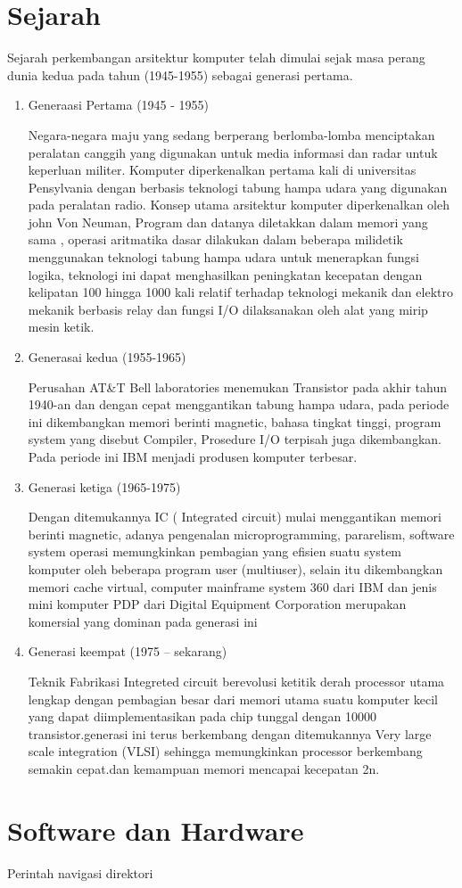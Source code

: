 \section{Sejarah}
Sejarah perkembangan arsitektur komputer telah dimulai sejak masa perang dunia kedua pada tahun (1945-1955) sebagai generasi pertama.
\begin{enumerate}
\item Generaasi Pertama (1945 - 1955)

Negara-negara maju yang sedang berperang berlomba-lomba menciptakan peralatan canggih yang digunakan untuk media informasi dan radar  untuk keperluan militer. Komputer diperkenalkan pertama kali di universitas Pensylvania dengan berbasis teknologi tabung hampa udara  yang digunakan pada peralatan radio. Konsep utama arsitektur komputer diperkenalkan oleh john Von Neuman,
Program dan datanya diletakkan dalam memori yang sama , operasi aritmatika dasar dilakukan dalam beberapa milidetik menggunakan teknologi tabung hampa udara untuk menerapkan fungsi logika, teknologi ini dapat menghasilkan peningkatan kecepatan  dengan kelipatan 100 hingga 1000 kali relatif terhadap teknologi mekanik dan elektro mekanik berbasis relay dan  fungsi I/O dilaksanakan oleh alat yang mirip mesin ketik.

\item Generasai kedua (1955-1965)

Perusahan AT\&T Bell laboratories menemukan Transistor pada akhir tahun 1940-an dan dengan cepat menggantikan tabung hampa udara, pada  periode ini dikembangkan memori berinti magnetic, bahasa tingkat tinggi, program system yang disebut Compiler, Prosedure I/O terpisah juga dikembangkan. Pada periode ini IBM menjadi produsen komputer terbesar.

\item Generasi ketiga (1965-1975)

Dengan ditemukannya  IC ( Integrated circuit) mulai menggantikan memori berinti magnetic, adanya pengenalan microprogramming, pararelism, software system operasi memungkinkan pembagian yang efisien suatu system komputer oleh beberapa program user (multiuser), selain itu dikembangkan memori cache virtual, computer  mainframe system 360 dari IBM dan jenis mini komputer PDP dari Digital Equipment Corporation merupakan komersial yang dominan pada generasi ini

\item Generasi keempat (1975 – sekarang)

Teknik Fabrikasi Integreted circuit berevolusi  ketitik derah processor utama lengkap dengan pembagian besar dari memori utama suatu komputer kecil yang dapat diimplementasikan pada chip tunggal dengan 10000 transistor.generasi ini terus berkembang dengan ditemukannya Very large scale integration (VLSI) sehingga memungkinkan processor berkembang semakin cepat.dan kemampuan memori mencapai kecepatan 2n. 


\end{enumerate}



\section{Software dan Hardware}
Perintah navigasi direktori


